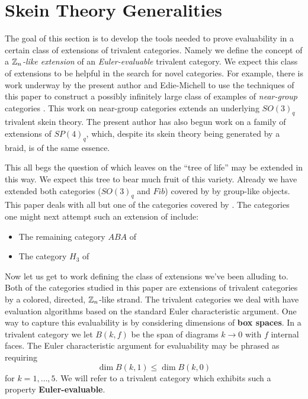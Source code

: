 \section{Skein Theory Generalities}

The goal of this section is to develop the tools needed to prove evaluability in a certain class of extensions of trivalent categories.
Namely we define the concept of a {\it $\mathbb{Z}_n$-like extension} of an {\it Euler-evaluable} trivalent category.
We expect this class of extensions to be helpful in the search for novel categories.
For example, there is work underway by the present author and Edie-Michell to use the techniques of this paper to 
construct a possibly infinitely large class of examples of {\it near-group} categories \cite{gannon_near-groups}.
This work on near-group categories \cite{cain_me_near-group} extends an underlying $SO(3)_q$ trivalent skein theory.
The present author has also begun work \cite{unpublished work} on a family of extensions of $SP(4)_q$, which, despite its skein theory being
generated by a braid, is of the same essence. 


This all begs the question of which leaves on the ``tree of life'' \cite{tricats} may be extended in this way.
We expect this tree to bear much fruit of this variety.
Already we have extended both categories ($SO(3)_q$ and $Fib$) covered by \cite[Theorem A]{tricats} by group-like objects.
This paper deals with all but one of the categories covered by \cite[Theorem B]{tricats}.
The categories one might next attempt such an extension of include:
\begin{itemize}
    \item The remaining category $ABA$ of \cite[Theorem B]{tricats}
    \item The category $H_3$ of \cite[Theorem C]{tricats}
\end{itemize}

Now let us get to work defining the class of extensions we've been alluding to.
Both of the categories studied in this paper are extensions of trivalent categories by a colored, directed, $\mathbb{Z}_n$-like strand. 
The trivalent categories we deal with have evaluation algorithms based on the standard Euler characteristic argument.
One way to capture this evaluability is by considering dimensions of {\bf box spaces}.
In a trivalent category we let $B(k,f)$ be the span of diagrams $k\to0$ with $f$ internal faces.
The Euler characteristic argument for evaluability may be phrased as requiring
\[
    \dim B(k,1) \leq \dim B(k,0)
\]
for $k=1,\dots,5$.
We will refer to a trivalent category which exhibits such a property {\bf Euler-evaluable}.

